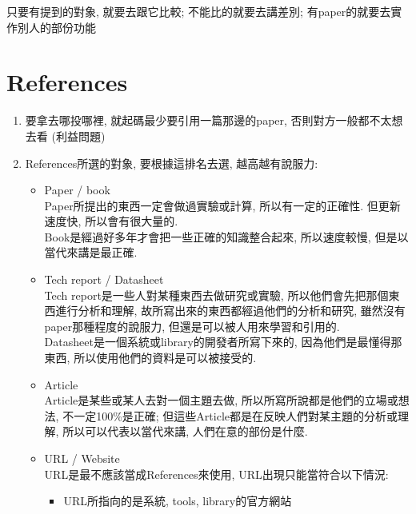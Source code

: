 只要有提到的對象, 就要去跟它比較; 不能比的就要去講差別; 有paper的就要去實作別人的部份功能

\section{References}

\begin{enumerate}
  \item
  {
    要拿去哪投哪裡, 就起碼最少要引用一篇那邊的paper, 否則對方一般都不太想去看 (利益問題)
  } %

  \item
  {
    References所選的對象, 要根據這排名去選, 越高越有說服力:
    \begin{itemize}
      \item
      {
        Paper / book\\
        Paper所提出的東西一定會做過實驗或計算, 所以有一定的正確性. 但更新速度快, 所以會有很大量的.\\
        Book是經過好多年才會把一些正確的知識整合起來, 所以速度較慢, 但是以當代來講是最正確.
      } %

      \item
      {
        Tech report / Datasheet\\
        Tech report是一些人對某種東西去做研究或實驗, 所以他們會先把那個東西進行分析和理解, 故所寫出來的東西都經過他們的分析和研究, 雖然沒有paper那種程度的說服力, 但還是可以被人用來學習和引用的.\\
        Datasheet是一個系統或library的開發者所寫下來的, 因為他們是最懂得那東西, 所以使用他們的資料是可以被接受的.
      } %

      \item
      {
        Article\\
        Article是某些或某人去對一個主題去做, 所以所寫所說都是他們的立場或想法, 不一定100\%是正確; 但這些Article都是在反映人們對某主題的分析或理解, 所以可以代表以當代來講, 人們在意的部份是什麼.
      } %

      \item
      {
        URL / Website\\
        URL是最不應該當成References來使用, URL出現只能當符合以下情況:
        \begin{itemize}
          \item
          {
            URL所指向的是系統, tools, library的官方網站
          } %


\end{itemize}}
\end{itemize}}
\end{enumerate}
